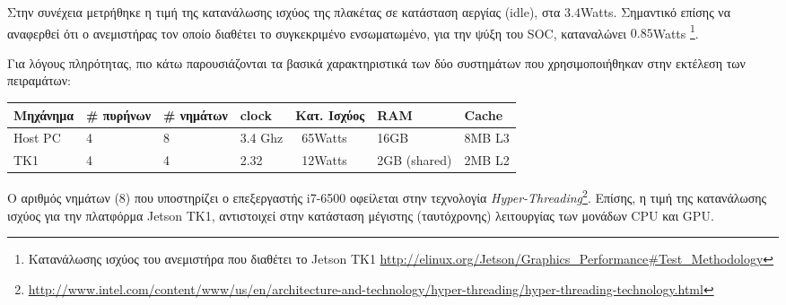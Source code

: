 Στην συνέχεια μετρήθηκε η τιμή της κατανάλωσης ισχύος της πλακέτας σε κατάσταση αεργίας (idle),
στα $3.4$Watts. Σημαντικό επίσης να αναφερθεί ότι ο ανεμιστήρας τον οποίο
διαθέτει το συγκεκριμένο ενσωματωμένο, για την ψύξη του SOC, καταναλώνει $0.85$Watts
\footnote{Κατανάλωσης ισχύος του ανεμιστήρα που διαθέτει το Jetson TK1 \url{http://elinux.org/Jetson/Graphics_Performance\#Test_Methodology}}.

Για λόγους πληρότητας, πιο κάτω παρουσιάζονται τα βασικά χαρακτηριστικά
των δύο συστημάτων που χρησιμοποιήθηκαν στην εκτέλεση των πειραμάτων:
\begin{center}
\small
\begin{tabular}{ | l | l | l | l | l | l | l | }
  \hline
  \rowcolor{Gray}
  Μηχάνημα & \# πυρήνων & \# νημάτων & clock & Κατ. Ισχύος & RAM & Cache \\
  \hline
  Host PC & 4 & 8 & 3.4 Ghz & ~65Watts & 16GB & 8MΒ L3 \\
  \hline
  TK1 & 4 & 4 & 2.32 & ~12Watts & 2GB (shared) & 2MB L2 \\
  \hline
\end{tabular}
\end{center}

Ο αριθμός νημάτων (8) που υποστηρίζει ο επεξεργαστής i7-6500 οφείλεται στην
τεχνολογία \emph{Hyper-Threading}\footnote{\url{http://www.intel.com/content/www/us/en/architecture-and-technology/hyper-threading/hyper-threading-technology.html}}.
Επίσης, η τιμή της κατανάλωσης ισχύος για την
πλατφόρμα Jetson TK1, αντιστοιχεί στην κατάσταση μέγιστης (ταυτόχρονης) λειτουργίας των μονάδων
CPU και GPU.




